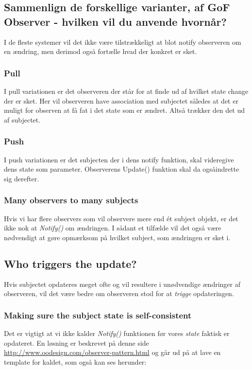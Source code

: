 \subsection{Sammenlign de forskellige varianter, af GoF Observer - hvilken vil du anvende hvornår?}
I de fleste systemer vil det ikke være tilstrækkeligt at blot notify observeren om en ændring, men derimod også fortælle hvad der konkret er sket.

\subsubsection{Pull}
I pull variationen er det observeren der står for at finde ud af hvilket state change der er sket. Her vil observeren have association med subjectet således at det er muligt for observen at få fat i det state som er ændret. Altså trækker den det ud af subjectet.

\subsubsection{Push}
I push variationen er det subjecten der i dens notify funktion, skal videregive dens state som parameter. Observerens Update() funktion skal da ogsåindrette sig derefter. 

\subsubsection{Many observers to many subjects}
Hvis vi har flere observers som vil observere mere end ét subject objekt, er det ikke nok at \textit{Notify()} om ændringen. I sådant et tilfælde vil det også være nødvendigt at gøre opmærksom på hvilket subject, som ændringen er sket i.

\subsection{Who triggers the update?}
Hvis subjectet opdateres meget ofte og vil resultere i unødvendige ændringer af observeren, vil det være bedre om observeren stod for at \textit{trigge} opdateringen.

\subsubsection{Making sure the subject state is self-consistent}
Det er vigtigt at vi ikke kalder \textit{Notify()} funktionen før vores \textit{state} faktisk er opdateret. En løsning er beskrevet på denne side \url{http://www.oodesign.com/observer-pattern.html} og går ud på at lave en template for kaldet, som også kan ses herunder:

